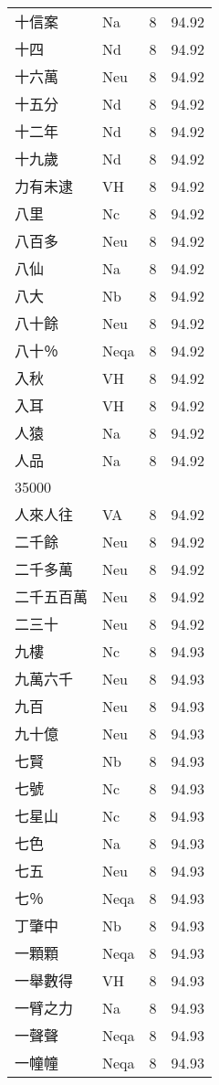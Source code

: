 \documentclass[twocolumn]{book}
\begin{document}
\begin{supertabular}{llrr}
十信案 & Na & 8 &  94.92\\
十四 & Nd & 8 &  94.92\\
十六萬 & Neu & 8 &  94.92\\
十五分 & Nd & 8 &  94.92\\
十二年 & Nd & 8 &  94.92\\
十九歲 & Nd & 8 &  94.92\\
力有未逮 & VH & 8 &  94.92\\
八里 & Nc & 8 &  94.92\\
八百多 & Neu & 8 &  94.92\\
八仙 & Na & 8 &  94.92\\
八大 & Nb & 8 &  94.92\\
八十餘 & Neu & 8 &  94.92\\
八十％ & Neqa & 8 &  94.92\\
入秋 & VH & 8 &  94.92\\
入耳 & VH & 8 &  94.92\\
人猿 & Na & 8 &  94.92\\
人品 & Na & 8 &  94.92\\
35000\\
人來人往 & VA & 8 &  94.92\\
二千餘 & Neu & 8 &  94.92\\
二千多萬 & Neu & 8 &  94.92\\
二千五百萬 & Neu & 8 &  94.92\\
二三十 & Neu & 8 &  94.92\\
九樓 & Nc & 8 &  94.93\\
九萬六千 & Neu & 8 &  94.93\\
九百 & Neu & 8 &  94.93\\
九十億 & Neu & 8 &  94.93\\
七賢 & Nb & 8 &  94.93\\
七號 & Nc & 8 &  94.93\\
七星山 & Nc & 8 &  94.93\\
七色 & Na & 8 &  94.93\\
七五 & Neu & 8 &  94.93\\
七％ & Neqa & 8 &  94.93\\
丁肇中 & Nb & 8 &  94.93\\
一顆顆 & Neqa & 8 &  94.93\\
一舉數得 & VH & 8 &  94.93\\
一臂之力 & Na & 8 &  94.93\\
一聲聲 & Neqa & 8 &  94.93\\
一幢幢 & Neqa & 8 &  94.93\\

\end{supertabular}
\end{document}
